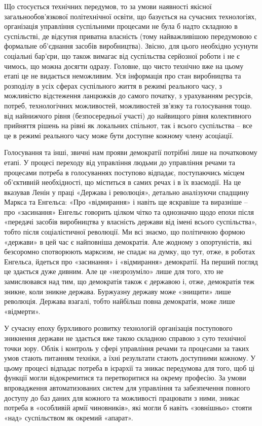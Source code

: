 \documentclass[../main]{subfiles}
\begin{document}
Що стосується технічних передумов, то за умови наявності якісної загальнообов’язкової політехнічної освіти, що базується на сучасних технологіях, організація управління суспільними процесами не була б надто складною в суспільстві, де відсутня приватна власність (тому найважливішою передумовою є формальне об’єднання засобів виробництва). Звісно, для цього необхідно усунути соціальні бар’єри, що також вимагає від суспільства серйозної роботи і не є чимось, що можна досягти одразу. Головне, що чисто технічно вже на цьому етапі це не видається неможливим. Уся інформація про стан виробництва та розподілу в усіх сферах суспільного життя в режимі реального часу, з можливістю відстеження ланцюжків до самого початку, з урахуванням ресурсів, потреб, технологічних можливостей, можливостей зв’язку та голосування тощо. від найнижчого рівня (безпосередньої участі) до найвищого рівня колективного прийняття рішень на рівні як локальних спільнот, так і всього суспільства – все це в режимі реального часу може бути доступне кожному члену асоціації.

Голосування та інші, звичні нам прояви демократії потрібні лише на початковому етапі. У процесі переходу від управління людьми до управління речами та процесами потреба в голосуваннях поступово відпадає, поступаючись місцем об’єктивній необхідності, що міститься в самих речах і в їх взаємодії. На це вказував Ленін у праці «Держава і революція», детально аналізуючи спадщину Маркса та Енгельса: «Про «відмирання» і навіть ще яскравіше та виразніше – про «засинання» Енгельс говорить цілком чітко та однозначно щодо епохи після «передачі засобів виробництва у власність держави від імені всього суспільства», тобто після соціалістичної революції. Ми всі знаємо, що політичною формою «держави» в цей час є найповніша демократія. Але жодному з опортуністів, які безсоромно спотворюють марксизм, не спадає на думку, що тут, отже, в роботах Енгельса, йдеться про «засинання» і «відмирання» демократії. На перший погляд це здається дуже дивним. Але це «незрозуміло» лише для того, хто не замислювався над тим, що демократія також є державою і, отже, демократія теж зникне, коли зникне держава. Буржуазну державу може «знищити» лише революція. Держава взагалі, тобто найбільш повна демократія, може лише «відмерти».

У сучасну епоху бурхливого розвитку технологій організація поступового зникнення держави не здається вже такою складною справою з суто технічної точки зору. Облік і контроль у сфері управління речами та процесами за таких умов стають питанням техніки, а їхні результати стають доступними кожному. У цьому процесі відпадає потреба в ієрархії та зникає передумова для того, щоб ці функції могли відокремитися та перетворитися на окрему професію. За умови впровадження автоматизованих систем для управління та забезпечення повного доступу до баз даних для кожного та можливості працювати з ними, зникає потреба в «особливій армії чиновників», які могли б навіть «зовнішньо» стояти «над» суспільством як окремий «апарат».
\end{document}
